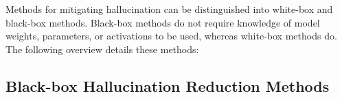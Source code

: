 


Methods for mitigating hallucination can be distinguished into white-box and black-box methods. Black-box methods do not require knowledge of model weights, parameters, or activations to be used, whereas white-box methods do. The following overview details these methods:

\subsection*{Black-box Hallucination Reduction Methods}

